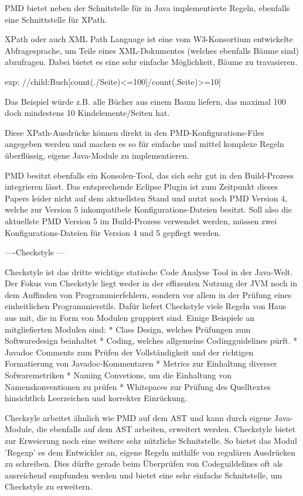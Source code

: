 PMD bietet neben der Schnitstelle für in Java implementierte Regeln, ebenfalls eine Schnittstelle für XPath. 

XPath oder auch XML Path Language ist eine vom W3-Konsortium entwickelte Abfragesprache, um Teile eines XML-Dokumentes (welches ebenfalls Bäume sind) abzufragen. Dabei bietet es eine sehr einfache Möglichkeit, Bäume zu travasieren.

exp: //child:Buch[count(./Seite)<=100]/count(.Seite)>=10]

Das Beispiel würde z.B. alle Bücher aus einem Baum liefern, das maximal 100 doch mindestens 10 Kindelemente/Seiten hat.

Diese XPath-Ausdrücke können direkt in den PMD-Konfigurations-Files angegeben werden und machen es so für einfache und mittel komplexe Regeln überflüssig, eigene Java-Module zu implementieren.

PMD besitzt ebenfalls ein Konsolen-Tool, das sich sehr gut in den Build-Prozess integrieren lässt. Das entsprechende Eclipse Plugin ist zum Zeitpunkt dieses Papers leider nicht auf dem aktuellsten Stand und nutzt noch PMD Version 4, welche zur Version 5 inkompatibele Konfigurations-Dateien besitzt. Soll also die aktuellste PMD Version 5 im Build-Prozess verwendet werden, müssen zwei Konfigurations-Dateien für Version 4 und 5 gepflegt werden.


----Checkstyle ---

Checkstyle ist das dritte wichtige statische Code Analyse Tool in der Java-Welt. Der Fokus von Checkstyle liegt weder in der effizenten Nutzung der JVM noch in dem Auffinden von Programmierfehlern, sondern vor allem in der Prüfung eines einheitlichen Programmierstils. 
Dafür liefert Checkstyle viele Regeln von Haus aus mit, die in Form von Modulen gruppiert sind. Einige Beispiele an mitgliefierten Modulen sind:
* Class Design, welches Prüfungen zum Softwaredesign beinhaltet
* Coding, welches allgemeine Codingguidelines pürft.
* Javadoc Comments zum Prüfen der Vollständigkeit und der richtigen Formatierung von Javadoc-Kommentaren
* Metrics zur Einhaltung diverser Sofwaremetriken
* Naming Convetions, um die Einhaltung von Namenskonventionen zu prüfen
* Whitspaces zur Prüfung des Quelltextes hinsichtlich Leerzeichen und korrekter Einrückung.

Checksyle arbeitet ähnlich wie PMD auf dem AST und kann durch eigene Java-Module, die ebenfalls auf dem AST arbeiten, erweitert werden. Checkstyle bietet zur Erweierung noch eine weitere sehr nützliche Schnitstelle. So bietet das Modul 'Regexp' es dem Entwickler an, eigene Regeln mithilfe von regulären Ausdrücken zu schreiben. Dies dürfte gerade beim Überprüfen von Codeguildelines oft als ausreichend empfunden werden und bietet eine sehr einfache Schnitstelle, um Checkstyle zu erweitern.

